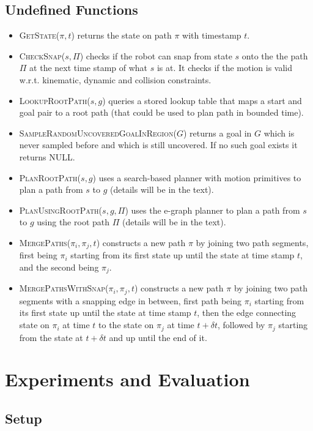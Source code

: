 \subsection*{Undefined Functions}
\begin{itemize}
  \item \textsc{GetState}($\pi,t$) returns the state on path $\pi$ with timestamp $t$.
  \item \textsc{CheckSnap}($s,\Pi$) checks if the robot can snap from state $s$ onto the the path $\Pi$ at the next time stamp of what $s$ is at. It checks if the motion is valid w.r.t. kinematic, dynamic and collision constraints.
  \item \textsc{LookupRootPath}($s,g$) queries a stored lookup table that maps a start and goal pair to a root path (that could be used to plan path in bounded time).
  \item \textsc{SampleRandomUncoveredGoalInRegion}($G$) returns a goal in $G$ which is never sampled before and which is still uncovered. If no such goal exists it returns NULL.
  \item \textsc{PlanRootPath}($s,g$) uses a search-based planner with motion primitives to plan a path from $s$ to $g$ (details will be in the text).
  \item \textsc{PlanUsingRootPath}($s,g,\Pi$) uses the e-graph planner to plan a path from $s$ to $g$ using the root path $\Pi$ (details will be in the text).
  \item \textsc{MergePaths}($\pi_i,\pi_j,t$) constructs a new path $\pi$ by joining two path segments, first being $\pi_i$ starting from its first state up until the state at time stamp $t$, and the second being $\pi_j$.
  \item \textsc{MergePathsWithSnap}($\pi_i,\pi_j,t$) constructs a new path $\pi$ by joining two path segments with a snapping edge in between, first path being $\pi_i$ starting from its first state up until the state at time stamp $t$, then the edge connecting state on $\pi_i$ at time $t$ to the state on $\pi_j$ at time $t + \delta t$, followed by $\pi_j$ starting from the state at $t + \delta t$ and up until the end of it.
\end{itemize}

\section{Experiments and Evaluation}
\subsection{Setup}

